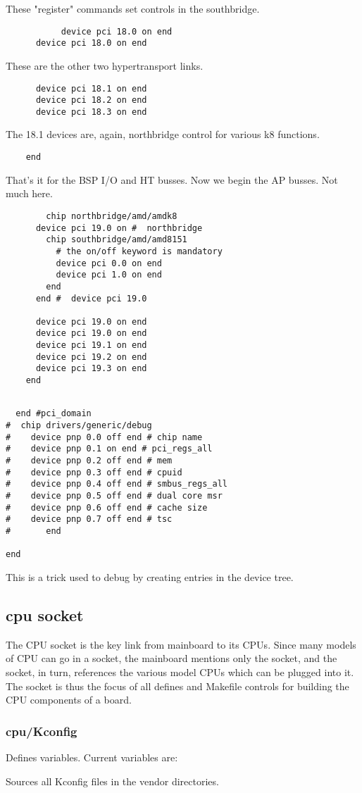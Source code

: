 \documentclass[10pt,letterpaper]{article}
\begin{document}
These "register" commands set controls in the southbridge.
\begin{verbatim}
           device pci 18.0 on end
      device pci 18.0 on end
\end{verbatim}
These are the other two hypertransport links.
\begin{verbatim}
      device pci 18.1 on end
      device pci 18.2 on end
      device pci 18.3 on end
\end{verbatim}
The 18.1 devices are, again, northbridge control for various k8 functions.
\begin{verbatim}
    end
  \end{verbatim}
That's it for the BSP I/O and HT busses. Now we begin the AP busses. Not much here.
\begin{verbatim}
        chip northbridge/amd/amdk8
      device pci 19.0 on #  northbridge
        chip southbridge/amd/amd8151
          # the on/off keyword is mandatory
          device pci 0.0 on end
          device pci 1.0 on end
        end
      end #  device pci 19.0

      device pci 19.0 on end
      device pci 19.0 on end
      device pci 19.1 on end
      device pci 19.2 on end
      device pci 19.3 on end
    end


\end{verbatim}
\begin{verbatim}
  end #pci_domain
#  chip drivers/generic/debug
#    device pnp 0.0 off end # chip name
#    device pnp 0.1 on end # pci_regs_all
#    device pnp 0.2 off end # mem
#    device pnp 0.3 off end # cpuid
#    device pnp 0.4 off end # smbus_regs_all
#    device pnp 0.5 off end # dual core msr
#    device pnp 0.6 off end # cache size
#    device pnp 0.7 off end # tsc
#       end

end
\end{verbatim}
This is a trick used to debug by creating entries in the device tree.

\subsection{cpu socket}
The CPU socket is the key link from mainboard to its CPUs. Since many models of CPU can go in a socket, the mainboard mentions only
the socket, and the socket, in turn, references the various model CPUs which can be plugged into it. The socket is thus the focus
of all defines and Makefile controls for building the CPU components of a board.

\subsubsection{ cpu/Kconfig}
Defines variables. Current variables are:

Sources all Kconfig files in the vendor directories.
\end{document}
